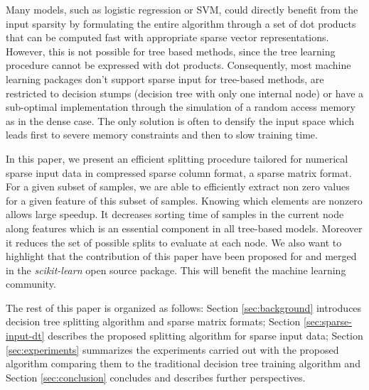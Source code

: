 Many models, such as logistic regression or SVM, could directly
benefit from the input sparsity by formulating the entire algorithm
through a set of dot products that can be computed fast with
appropriate sparse vector representations. However, this is not
possible for tree based methods, since the tree learning procedure
cannot be expressed with dot products. Consequently, most machine
learning packages don't support sparse input for tree-based methods,
are restricted to decision stumps (decision tree with only one
internal node) or have a sub-optimal implementation through the
simulation of a random access memory as in the dense case. The only
solution is often to densify the input space which leads first to
severe memory constraints and then to slow training time.

In this paper, we present an efficient splitting procedure tailored for
numerical sparse input data in compressed sparse column format, a sparse matrix
format. For a given subset of samples, we are able to efficiently extract non
zero values for a given feature of this subset of samples. Knowing which
elements are nonzero allows large speedup. It decreases sorting time of
samples in the current node along features which is an essential component in
all tree-based models. Moreover it reduces the set of possible splits to
evaluate at each node. We also want to highlight that the contribution of this
paper have been proposed for and merged in the  \emph{scikit-learn}
\cite{buitinck2013api,pedregosa2011scikit} open source package. This will
benefit the machine learning community.

The rest of this paper is organized as follows: Section \ref{sec:background}
introduces decision tree splitting algorithm and sparse matrix formats; Section
\ref{sec:sparse-input-dt} describes the proposed splitting algorithm for sparse
input data; Section \ref{sec:experiments} summarizes the experiments carried out with the proposed algorithm comparing them to the traditional decision tree training algorithm
and Section \ref{sec:conclusion} concludes and describes further
perspectives.

